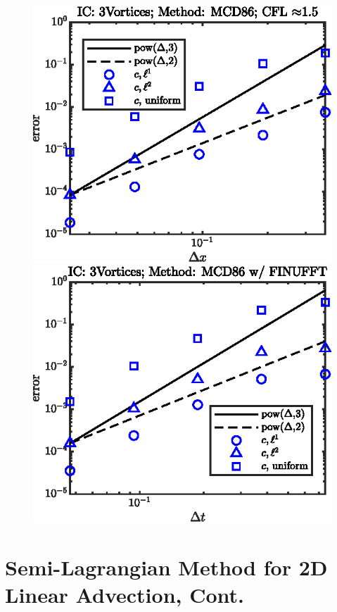 \documentclass[11pt,letterpaper]{article}
\begin{document}
\begin{figure}[H]
    \includegraphics{figs/nonlin_conv_order_3Vortices_MCD86}
    \includegraphics{figs/nonlin_conv_order_3Vortices_finu_MCD86}
    \caption{}\label{fig:nonlin_conv_order_Taylor_MCD86}
\end{figure}

\section{Semi-Lagrangian Method for 2D Linear Advection, Cont.}\label{sec:adv_NS}


\newpage


\end{document}
